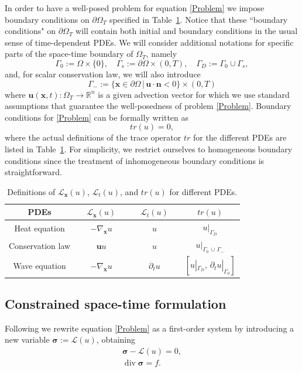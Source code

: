 \documentclass[a4paper,12pt]{amsart}
\numberwithin{equation}{section}
\renewcommand{\div}{\operatorname{div}}
\def\bu{{\mathbf u}}
\def\bn{{\mathbf n}}
\renewcommand{\L}{{\mathcal L}}
\def\XVec#1{{\mathbf #1}}
\def\Xx{\XVec{x}}
\def\bsigma{{\boldsymbol \sigma}}
\begin{document}


In order to have a well-posed problem for equation \eqref{Problem} we impose boundary conditions on $\partial \Omega_T$ specified in Table~\ref{tab:PDE_operators}. Notice that these ``boundary conditions" on  $\partial \Omega_T$ will contain both initial and boundary conditions in the usual sense of time-dependent PDEs. We will consider additional notations for specific parts of the space-time boundary of $\Omega_T$, namely 
\[
\Gamma_0 := \Omega\times\{0\},\quad\Gamma_s := \partial\Omega\times(0, T),\quad\Gamma_D := \Gamma_0\cup\Gamma_s,
\]
and, for scalar conservation law, we will also introduce 
\[
\Gamma_- := \{\Xx\in\partial\Omega \,|\, \bu\cdot\bn < 0 \}\times(0, T)
\]
where $\bu(\Xx,t) : \Omega_T \rightarrow \mathbb{R}^n$ is a given advection vector for which we use standard assumptions that guarantee the well-posedness \cite{evans} of problem \eqref{Problem}. Boundary conditions for  \eqref{Problem} can be formally written as
\[
tr (u) = 0,
\]
where the actual definitions of the trace operator $tr$ for the different PDEs are listed in Table~\ref{tab:PDE_operators}. For simplicity, we restrict ourselves to homogeneous boundary conditions since the treatment of inhomogeneous boundary conditions is straightforward. 
\begin{table}[h]
\caption{Definitions of $\L_\Xx(u)$, $\L_t(u)$, and $tr(u)$ for different PDEs.}
\label{tab:PDE_operators}
\begin{tabular}{ |c||c|c|c|} \hline
PDEs & $\quad \L_\Xx(u) \quad$ & $\quad \L_t(u) \quad$ & $\quad tr(u) \quad$  \\ \hline
Heat equation & $-\nabla_\Xx u$ & $u$ & $u|_{\Gamma_D}$ \\ \hline
Conservation law & $\bu u$ & $u$ & $u|_{\Gamma_0\,\cup\,\Gamma_-}$   \\ \hline
Wave equation & $-\nabla_\Xx u$ & $\partial_t u$ & $[u|_{\Gamma_D}, \,\partial_tu|_{\Gamma_0}]$    \\ \hline
\end{tabular}
\end{table}

\subsection{Constrained space-time formulation} 
Following \cite{neumueller_vassilevski_villa} we rewrite equation \eqref{Problem} as a first-order system by introducing a new variable $\bsigma := \L(u)$, 
obtaining 
\begin{equation}
\begin{array}{c}
\bsigma - \L(u)  = 0,  \\ 
\div \bsigma = f. 
\end{array}
\label{eq:fos} 
\end{equation}
\end{document}
